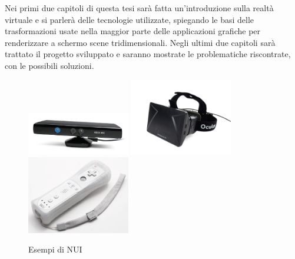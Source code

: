 Nei primi due capitoli di questa tesi sarà fatta un'introduzione sulla realtà virtuale e si parlerà delle tecnologie utilizzate, spiegando le basi delle trasformazioni usate nella maggior parte delle applicazioni grafiche per renderizzare a schermo scene tridimensionali. Negli ultimi due capitoli sarà trattato il progetto sviluppato e saranno mostrate le problematiche riscontrate, con le possibili soluzioni.



\begin{figure}[htbp]
\centering
\includegraphics[width=0.4\textwidth]{images/introduzione/kinect.png}
\includegraphics[width=0.4\textwidth]{images/introduzione/oculus-rift.jpg}
\includegraphics[width=0.4\textwidth]{images/introduzione/wii.jpg}
\caption{Esempi di NUI}
\end{figure}
